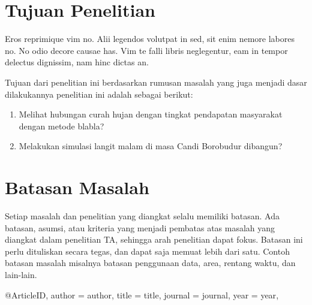 \section{Tujuan Penelitian}
\noindent Eros reprimique vim no. Alii legendos volutpat in sed, sit enim nemore labores no. No odio decore causae has. Vim te falli libris neglegentur, eam in tempor delectus dignissim, nam hinc dictas an.

\noindent Tujuan dari penelitian ini berdasarkan rumusan masalah yang juga menjadi dasar dilakukannya penelitian ini adalah sebagai berikut:
\begin{enumerate}
    \item Melihat hubungan curah hujan dengan tingkat pendapatan masyarakat dengan metode blabla?
    \item Melakukan simulasi langit malam di masa Candi Borobudur dibangun?
\end{enumerate}

\section{Batasan Masalah}
\noindent Setiap masalah dan penelitian yang diangkat selalu memiliki batasan. Ada batasan, asumsi, atau kriteria yang menjadi pembatas atas masalah yang diangkat dalam penelitian TA, sehingga arah penelitian dapat fokus. Batasan ini perlu dituliskan secara tegas, dan dapat saja memuat lebih dari satu. Contoh batasan masalah misalnya batasan penggunaan data, area, rentang waktu, dan lain-lain.


@Article{ID,
	author = {author},
	title = {title},
	journal = {journal},
	year = {year},
}

